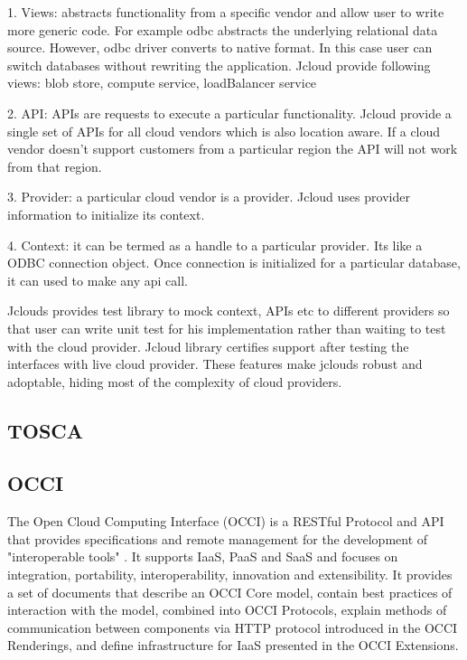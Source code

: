 {     1. Views: abstracts functionality from a specific vendor and
        allow user to write more generic code. For example odbc
        abstracts the underlying relational data source. However, odbc
        driver converts to native format. In this case user can switch
        databases without rewriting the application. Jcloud provide
        following views: blob store, compute service, loadBalancer
        service

     2. API: APIs are requests to execute a particular
        functionality. Jcloud provide a single set of APIs for all
        cloud vendors which is also location aware. If a cloud vendor
        doesn’t support customers from a particular region the API
        will not work from that region.

     3. Provider: a particular cloud vendor is a provider. Jcloud uses
        provider information to initialize its context.

     4. Context: it can be termed as a handle to a particular
        provider. Its like a ODBC connection object. Once connection
        is initialized for a particular database, it can used to make
        any api call.

        Jclouds provides test library to mock context, APIs etc to
        different providers so that user can write unit test for his
        implementation rather than waiting to test with the cloud
        provider. Jcloud library certifies support after testing the
        interfaces with live cloud provider. These features make
        jclouds robust and adoptable, hiding most of the complexity of
        cloud providers.

        \pv

\subsection{TOSCA}


\subsection{OCCI}

     The Open Cloud Computing Interface (OCCI) is a RESTful
     Protocol and API that provides specifications  and remote
     management for the development of "interoperable tools"
     \cite{www-occi}. It supports IaaS, PaaS and SaaS and
     focuses on integration, portability, interoperability,
     innovation and extensibility. It provides a set of documents
     that describe an OCCI Core model, contain best practices
     of interaction with the model, combined into OCCI Protocols,
     explain methods of communication between components via
     HTTP protocol introduced in the OCCI Renderings, and
     define infrastructure for IaaS presented in the OCCI
     Extensions.

}
